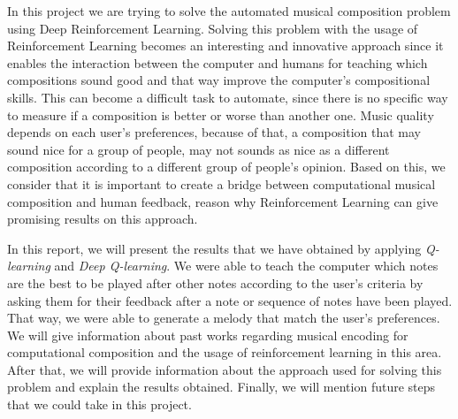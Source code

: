 In this project we are trying to solve the automated musical composition problem using Deep Reinforcement Learning. Solving this problem with the usage of Reinforcement Learning becomes an interesting and innovative approach since it enables the interaction between the computer and humans for teaching which compositions sound good and that way improve the computer's compositional skills. This can become a difficult task to automate, since there is no specific way to measure if a composition is better or worse than another one. Music quality depends on each user's preferences, because of that, a composition that may sound nice for a group of people, may not sounds as nice as a different composition according to a different group of people's opinion. Based on this, we consider that it is important to create a bridge between computational musical composition and human feedback, reason why Reinforcement Learning can give promising results on this approach.

In this report, we will present the results that we have obtained by applying \emph{Q-learning} and \emph{Deep Q-learning}. We were able to teach the computer which notes are the best to be played after other notes according to the user's criteria by asking them for their feedback after a note or sequence of notes have been played. That way, we were able to generate a melody that match the user's preferences. We will give information about past works regarding musical encoding for computational composition and the usage of reinforcement learning in this area. After that, we will provide information about the approach used for solving this problem and explain the results obtained. Finally, we will mention future steps that we could take in this project.